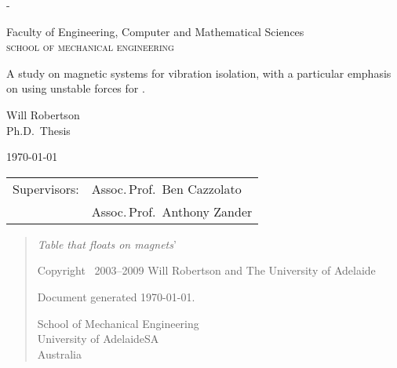 
\thispagestyle{empty}
\label{titlepage}
\calccentering{\unitlength}
\begin{adjustwidth*}{\unitlength}{-\unitlength} 
\setlength{\parindent}{0pt}

\begin{flushright}
\end{flushright}

\vfill

Faculty of Engineering,
Computer and Mathematical Sciences\\
\textsc{school of mechanical engineering}

\vfill

{\Large\raggedright 
A study on magnetic systems for
vibration isolation, with a particular
emphasis on using unstable forces for
\qzs.}

\vspace{10mm}

Will Robertson\\
Ph.D.\ Thesis
\vspace{10mm}

\today

\vfill

\vfill
    
\begin{tabular}{@{}ll}
Supervisors:    & Assoc.\,Prof.\ Ben Cazzolato  \\
                & Assoc.\,Prof.\ Anthony Zander
\end{tabular}
\end{adjustwidth*}

\newpage
\thispagestyle{empty}
\null
\vfill
\begin{quote} 
  \LARGE
  \textit{Table that floats on magnets}'

  \vfill
  \normalsize
  \raggedright
  Copyright \textcopyright\ 2003--2009 Will Robertson 
  and The University of Adelaide

  \bigskip
  Document generated \today.

  \bigskip
  School of Mechanical Engineering\\
  University of Adelaide\quad SA\\
  Australia\\
\end{quote}

